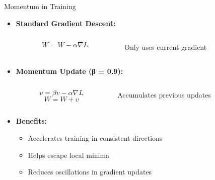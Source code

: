 \documentclass{beamer}
\begin{document}
\begin{frame}{Momentum in Training}
    \begin{itemize}
        \item \textbf{Standard Gradient Descent:}
            \begin{minipage}{\textwidth}
                \begin{columns}
                    \begin{column}{0.45\textwidth}
                        $$W = W - \alpha \nabla L$$
                    \end{column}
                    \begin{column}{0.45\textwidth}
                        Only uses current gradient
                    \end{column}
                \end{columns}
            \end{minipage}
        \vspace{0.25cm}

        \item \textbf{Momentum Update (β = 0.9):}
            \begin{minipage}{\textwidth}
                \begin{columns}
                    \begin{column}{0.45\textwidth}
                        $$v = \beta v - \alpha \nabla L$$
                        $$W = W + v$$
                    \end{column}
                    \begin{column}{0.45\textwidth}
                        Accumulates previous updates
                    \end{column}
                \end{columns}
            \end{minipage}
        \vspace{0.25cm}

        \item \textbf{Benefits:}
            \begin{itemize}
                \item Accelerates training in consistent directions
                \item Helps escape local minima
                \item Reduces oscillations in gradient updates
            \end{itemize}
    \end{itemize}
\end{frame}
\end{document}
